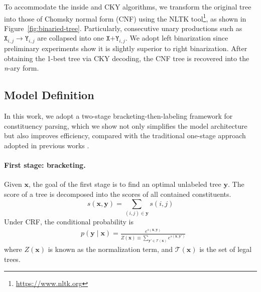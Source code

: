 \documentclass{article}
\begin{document}
To accommodate the inside and CKY algorithms, we transform the original tree into
those of Chomsky normal form (CNF) using the NLTK tool\footnote{\url{https://www.nltk.org}}, as shown in Figure~\ref{fig:binaried-tree}.
Particularly, consecutive unary productions such as $\texttt{X}_{i,j} \rightarrow \texttt{Y}_{i,j}$ are collapsed into one $\texttt{X+Y}_{i,j}$.
We adopt left binarization since preliminary experiments show it is slightly superior to right binarization.
After obtaining the 1-best tree via CKY decoding, the CNF tree is recovered into the \textit{n}-ary form.




\subsection{Model Definition} \label{sec:model-defination}
\label{sub@section:model-definition}

In this work, we adopt a two-stage bracketing-then-labeling framework for constituency parsing, which we show not only simplifies the model architecture but also improves efficiency, compared with the traditional one-stage approach adopted in previous works \cite{stern-etal-2017-minimal,gaddy-etal-2018-whats}.





\paragraph{First stage: bracketing.}
Given $\boldsymbol{x}$, the goal of the first stage is to find an optimal unlabeled tree $\boldsymbol{y}$.
The score of a tree is decomposed into the scores of all contained constituents.
\begin{equation} \label{equation:tree-score}
s(\boldsymbol{x},\boldsymbol{y}) = \sum\limits_{(i,j)\in \boldsymbol{y}}s(i,j)
\end{equation}
Under CRF, the conditional probability is
\begin{equation}\label{equation:tree-prob}
\begin{split}
& p(\boldsymbol{y}\mid\boldsymbol{x})  = \frac{e^{s(\boldsymbol{x},\boldsymbol{y})}}{Z(\boldsymbol{x}) \equiv \sum\limits_{\boldsymbol{y'} \in \mathcal{T}(\boldsymbol{x})} {e^{s(\boldsymbol{x},\boldsymbol{y'})}}}
\end{split}
\end{equation}
where $Z(\boldsymbol{x})$ is known as the normalization term, and $\mathcal{T}(\boldsymbol{x})$ is the set of legal trees.
\end{document}
